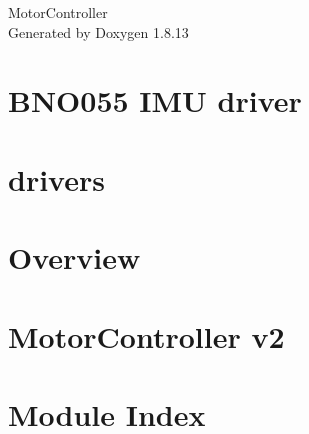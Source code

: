 \documentclass[twoside]{book}
\newcommand{\+}{\discretionary{\mbox{\scriptsize$\hookleftarrow$}}{}{}}
\newcommand{\clearemptydoublepage}{%
  \newpage{\pagestyle{empty}\cleardoublepage}%
}
\begin{document}
\hypersetup{pageanchor=false,
             bookmarksnumbered=true,
             pdfencoding=unicode
            }
\begin{titlepage}
\vspace*{7cm}
\begin{center}%
{\Large Motor\+Controller }\\
\vspace*{1cm}
{\large Generated by Doxygen 1.8.13}\\
\end{center}
\end{titlepage}
\clearemptydoublepage
{}
\tableofcontents
\clearemptydoublepage
{}
\hypersetup{pageanchor=true}

\chapter{B\+N\+O055 I\+MU driver}
\label{md__home_sylvain_Documents_TelecomRobotics_MotorControllerv2_drivers_bno055_README}
\hypertarget{md__home_sylvain_Documents_TelecomRobotics_MotorControllerv2_drivers_bno055_README}{}

\chapter{drivers}
\label{md__home_sylvain_Documents_TelecomRobotics_MotorControllerv2_drivers_README}
\hypertarget{md__home_sylvain_Documents_TelecomRobotics_MotorControllerv2_drivers_README}{}

\chapter{Overview}
\label{md__home_sylvain_Documents_TelecomRobotics_MotorControllerv2_README}
\hypertarget{md__home_sylvain_Documents_TelecomRobotics_MotorControllerv2_README}{}

\chapter{Motor\+Controller v2}
\label{md__home_sylvain_Documents_TelecomRobotics_MotorControllerv2_specs}
\hypertarget{md__home_sylvain_Documents_TelecomRobotics_MotorControllerv2_specs}{}

\chapter{Module Index}

\end{document}
